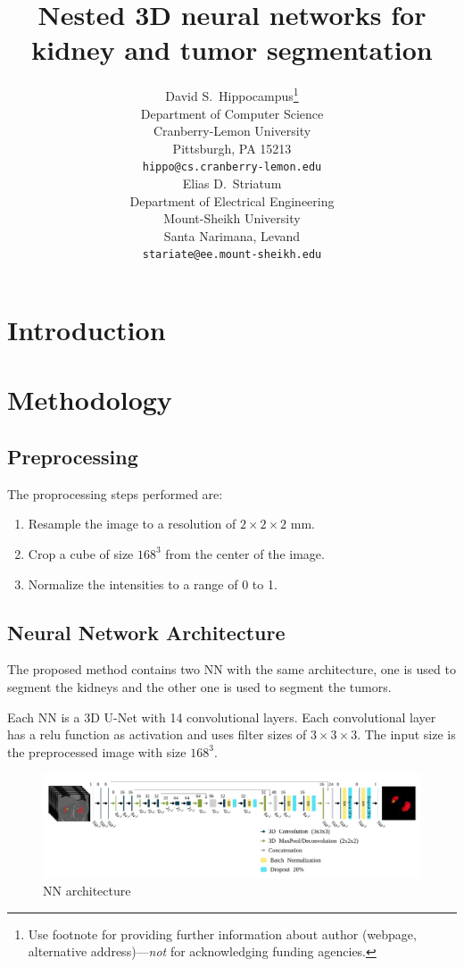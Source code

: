 \documentclass{article}
\title{Nested 3D neural networks for kidney and tumor segmentation}
\author{
  David S.~Hippocampus\thanks{Use footnote for providing further
    information about author (webpage, alternative
    address)---\emph{not} for acknowledging funding agencies.} \\
  Department of Computer Science\\
  Cranberry-Lemon University\\
  Pittsburgh, PA 15213 \\
  \texttt{hippo@cs.cranberry-lemon.edu} \\
   \And
 Elias D.~Striatum \\
  Department of Electrical Engineering\\
  Mount-Sheikh University\\
  Santa Narimana, Levand \\
  \texttt{stariate@ee.mount-sheikh.edu} \\
}
\begin{document}
\maketitle

\begin{abstract}
\lipsum[1]
\end{abstract}




\section{Introduction}
\label{sec:intro}
\section{Methodology}
\label{sec:methods}

\subsection{Preprocessing}
\label{sec:prepro}
The proprocessing steps performed are:
\begin{enumerate}
    \item Resample the image to a resolution of $2 \times 2 \times 2$ mm. 
    \item Crop a cube of size $168^3$ from the center of the image. 
    \item Normalize the intensities to a range of 0 to 1.
\end{enumerate}

\subsection{Neural Network Architecture}
\label{sec:nnarc}
The proposed method contains two NN with the same architecture, one is used to segment the kidneys and the other one 
is used to segment the tumors. 

Each NN is a 3D U-Net with 14 convolutional layers. Each convolutional layer has a relu function as activation and uses
filter sizes of $3\times 3 \times 3$. The input size is the preprocessed image with size $168^3$. 

\begin{figure}[h]
    \centering
    \includegraphics[totalheight=.20\textheight]{imgs/nn.png}
    \caption{NN architecture }
    \label{fig:mobile1}
\end{figure}
\end{document}
